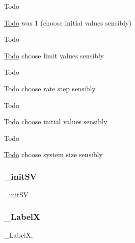 \begin{DoxyRefDesc}{Todo}
\item[\hyperlink{todo__todo000039}{Todo}]was 1 (choose initial values sensibly) \end{DoxyRefDesc}
\begin{DoxyRefDesc}{Todo}
\item[\hyperlink{todo__todo000040}{Todo}]choose limit values sensibly \end{DoxyRefDesc}
\begin{DoxyRefDesc}{Todo}
\item[\hyperlink{todo__todo000041}{Todo}]choose rate step sensibly \end{DoxyRefDesc}
\begin{DoxyRefDesc}{Todo}
\item[\hyperlink{todo__todo000042}{Todo}]choose initial values sensibly \end{DoxyRefDesc}
\begin{DoxyRefDesc}{Todo}
\item[\hyperlink{todo__todo000043}{Todo}]choose system size sensibly \end{DoxyRefDesc}
\mbox{\label{class_mu_mo_t_1_1_mu_mo_tbifurcation_view_a5c3de6779b1f8c64730cee48ca65491d}} 
\subsubsection{\texorpdfstring{\+\_\+init\+SV}{\_initSV}}
{\footnotesize\ttfamily \+\_\+init\+SV\hspace{0.3cm}{\ttfamily [private]}}

\mbox{\label{class_mu_mo_t_1_1_mu_mo_tbifurcation_view_a1ae22852e6ebc2a6b1cdfee3383063e9}} 
\subsubsection{\texorpdfstring{\+\_\+\+LabelX}{\_LabelX}}
{\footnotesize\ttfamily \+\_\+\+LabelX\hspace{0.3cm}{\ttfamily [static]}, {\ttfamily [private]}}

